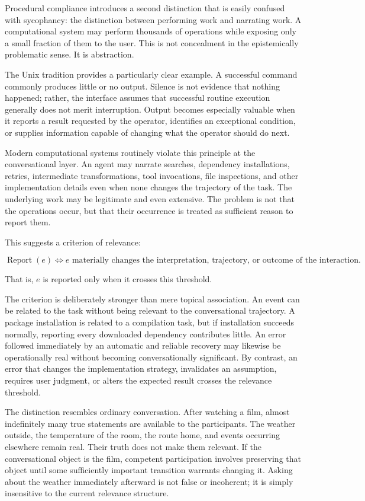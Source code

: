 \documentclass[11pt]{article}
\begin{document}
Procedural compliance introduces a second distinction that is easily confused with sycophancy: the distinction between performing work and narrating work. A computational system may perform thousands of operations while exposing only a small fraction of them to the user. This is not concealment in the epistemically problematic sense. It is abstraction.

The Unix tradition provides a particularly clear example. A successful command commonly produces little or no output. Silence is not evidence that nothing happened; rather, the interface assumes that successful routine execution generally does not merit interruption. Output becomes especially valuable when it reports a result requested by the operator, identifies an exceptional condition, or supplies information capable of changing what the operator should do next.

Modern computational systems routinely violate this principle at the conversational layer. An agent may narrate searches, dependency installations, retries, intermediate transformations, tool invocations, file inspections, and other implementation details even when none changes the trajectory of the task. The underlying work may be legitimate and even extensive. The problem is not that the operations occur, but that their occurrence is treated as sufficient reason to report them.

This suggests a criterion of relevance:

\[
\operatorname{Report}(e) \iff e \text{ materially changes the interpretation, trajectory, or outcome of the interaction.}
\]

That is, $e$ is reported only when it crosses this threshold.

The criterion is deliberately stronger than mere topical association. An event can be related to the task without being relevant to the conversational trajectory. A package installation is related to a compilation task, but if installation succeeds normally, reporting every downloaded dependency contributes little. An error followed immediately by an automatic and reliable recovery may likewise be operationally real without becoming conversationally significant. By contrast, an error that changes the implementation strategy, invalidates an assumption, requires user judgment, or alters the expected result crosses the relevance threshold.

The distinction resembles ordinary conversation. After watching a film, almost indefinitely many true statements are available to the participants. The weather outside, the temperature of the room, the route home, and events occurring elsewhere remain real. Their truth does not make them relevant. If the conversational object is the film, competent participation involves preserving that object until some sufficiently important transition warrants changing it. Asking about the weather immediately afterward is not false or incoherent; it is simply insensitive to the current relevance structure.
\end{document}
